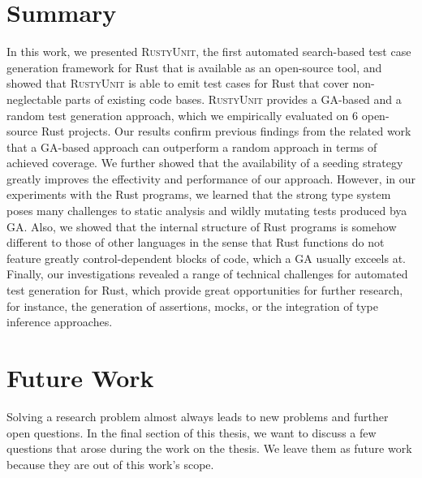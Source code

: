 \documentclass[paper=a4,%
  twoside,%
  BCOR4mm,%
  abstract=true,%
  toc=bibliography,%
  chapterprefix=true,%
  toc=bibliographynumbered,%
  open=right,%
  english,%
  pagesize=pdftex]{scrreprt}
\newcommand{\benchnum}{6\xspace}
\newcommand{\tech}{\textsc{RustyUnit}\xspace}
\newcommand{\ga}{\ac{GA}\xspace}
\begin{document}
\section{Summary}
\label{sec:summary}
In this work, we presented \tech, the first automated search-based test case generation framework for Rust that is available as an open-source tool, and showed that \tech is able to emit test cases for Rust that cover non-neglectable parts of existing code bases. \tech provides a \ga-based and a random test generation approach, which we empirically evaluated on \benchnum open-source Rust projects. Our results confirm previous findings from the related work that a \ga-based approach can outperform a random approach in terms of achieved coverage. We further showed that the availability of a seeding strategy greatly improves the effectivity and performance of our approach. However, in our experiments with the Rust programs, we learned that the strong type system poses many challenges to static analysis and wildly mutating tests produced bya \ga. Also, we showed that the internal structure of Rust programs is somehow different to those of other languages in the sense that Rust functions do not feature greatly control-dependent blocks of code, which a \ga usually exceels at. Finally, our investigations revealed a range of technical challenges for automated test generation for Rust, which provide great opportunities for further research, for instance, the generation of assertions, mocks, or the integration of type inference approaches.

\section{Future Work}
\label{sec:future-work}
Solving a research problem almost always leads to new problems and further open questions. In the final section of this thesis, we want to discuss a few questions that arose during the work on the thesis. We leave them as future work because they are out of this work's scope.
\end{document}
